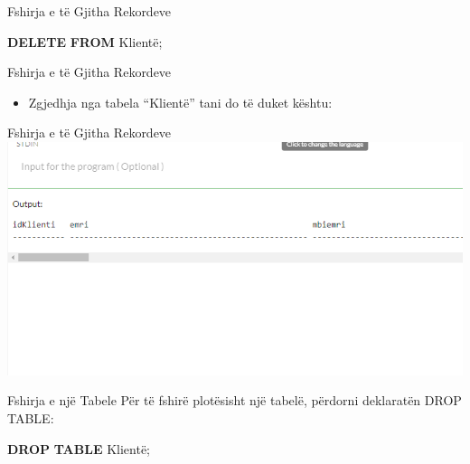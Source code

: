 \documentclass[
  ignorenonframetext,
]{beamer}
\newenvironment{Shaded}{\begin{snugshade}}{\end{snugshade}}
\newcommand{\KeywordTok}[1]{\textcolor[rgb]{0.13,0.29,0.53}{\textbf{#1}}}
\newcommand{\NormalTok}[1]{#1}
\providecommand{\tightlist}{%
  \setlength{\itemsep}{0pt}\setlength{\parskip}{0pt}}
\begin{document}
\begin{frame}[fragile]{Fshirja e të Gjitha Rekordeve}
\label{fshirja-e-tuxeb-gjitha-rekordeve-3}

\begin{Shaded}
\begin{Highlighting}[]
\KeywordTok{DELETE} \KeywordTok{FROM}\NormalTok{ Klientë;}
\end{Highlighting}
\end{Shaded}
\end{frame}

\begin{frame}{Fshirja e të Gjitha Rekordeve}
\label{fshirja-e-tuxeb-gjitha-rekordeve-4}
\begin{itemize}
\tightlist
\item
  Zgjedhja nga tabela ``Klientë'' tani do të duket kështu:
\end{itemize}
\end{frame}

\begin{frame}{Fshirja e të Gjitha Rekordeve}
\label{fshirja-e-tuxeb-gjitha-rekordeve-5}
\includegraphics{./Figs/query39.png}
\end{frame}

\begin{frame}[fragile]{Fshirja e një Tabele}
\label{fshirja-e-njuxeb-tabele}
Për të fshirë plotësisht një tabelë, përdorni deklaratën DROP TABLE:


\begin{Shaded}
\begin{Highlighting}[]
\KeywordTok{DROP} \KeywordTok{TABLE}\NormalTok{ Klientë;}
\end{Highlighting}
\end{Shaded}
\end{frame}
\end{document}
